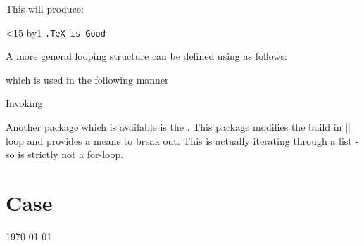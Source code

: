 This will produce:

\newcount\n
\def\punishment#1#2{\n=0
\loop\ifnum\n<#2 \advance\n by1
{\tt {\number\n.}#1\endgraf}\repeat}

\punishment{TeX is Good}{15}



A more general looping structure can be defined using \latex as follows:

\begin{teX}
\newcommand{\forloop}[5][1]%
{%
\setcounter{#2}{#3}%
\ifthenelse{#4}%
	{%
	#5%
	\addtocounter{#2}{#1}%
	\forloop[#1]{#2}{\value{#2}}{#4}{#5}%
	}%
	{%
	}%
}%
\end{teX}

which is used in the following manner


\begin{teX}
\end{teX}

\begin{teX}
\newcommand{\forLoop}[5][1]
{%
\setcounter{#4}{#2}%
\ifthenelse{ \value{#4} < #3 }%
	{%
	#5%
	\addtocounter{#4}{#1}%
	\forLoop[#1]{\value{#4}}{#3}{#4}{#5}%
	}%
	{%
	\ifthenelse{\value{#4} = #3}%
		{%
		#5%
		}%
		{}%
	}%
}
\end{teX}

Invoking

\begin{teX}
\end{teX}

Another package which is available is the . This package modifies the \latex build in |\@for| loop and provides
a means to break out. This is actually iterating through a list - so is strictly not a for-loop.

\section*{Case}

\textsc{\today}

\renewcommand\today{\number\day \ 
  \ifcase\month\or
     January\or February\or March\or April\or May\or June\or
     July\or August\or September\or October\or November\or December
  \fi
  \number\year}

